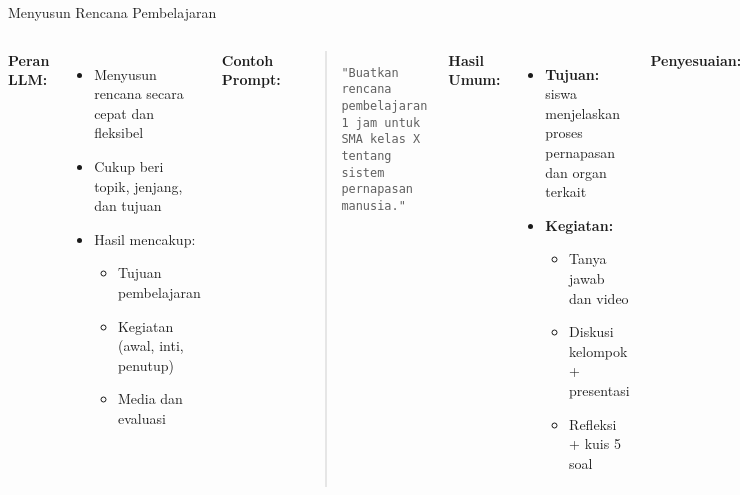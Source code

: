 \documentclass[aspectratio=169, table]{beamer}
\begin{document}
\begin{frame}[fragile]{Menyusun Rencana Pembelajaran}
	\vspace{20pt}
	\small
	\begin{columns}[T]
		\textbf{Peran LLM:}
		\begin{itemize}
			\item Menyusun rencana secara cepat dan fleksibel
			\item Cukup beri topik, jenjang, dan tujuan
			\item Hasil mencakup:
			\begin{itemize}
				\item Tujuan pembelajaran
				\item Kegiatan (awal, inti, penutup)
				\item Media dan evaluasi
			\end{itemize}
		\end{itemize}
		
		\textbf{Contoh Prompt:}
		\begin{quote}
			\centering
			\texttt{"Buatkan rencana pembelajaran 1 jam untuk SMA kelas X tentang sistem pernapasan manusia."}
		\end{quote}
		
		\textbf{Hasil Umum:}
		\begin{itemize}
			\item \textbf{Tujuan:} siswa menjelaskan proses pernapasan dan organ terkait
			\item \textbf{Kegiatan:}
			\begin{itemize}
				\item Tanya jawab dan video
				\item Diskusi kelompok + presentasi
				\item Refleksi + kuis 5 soal
			\end{itemize}
		\end{itemize}
		
		\textbf{Penyesuaian:}
		\begin{itemize}
			\item Kebutuhan khusus (misal: narasi audio)
			\item Versi bilingual / Bahasa Inggris
			\item Gaya ajar: PBL, tematik, dll.
			\item Kurikulum dan konteks kelas
		\end{itemize}
		
		
	\end{columns}
\end{frame}
\end{document}
